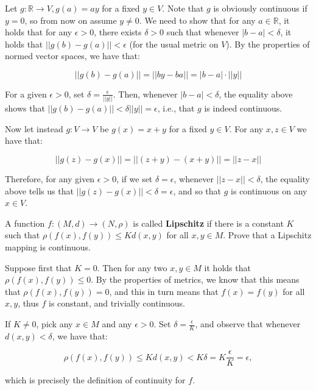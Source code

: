 \begin{solution}
    
    Let $g: \mathbb{R} \rightarrow V, g(a) = ay$ for a fixed $y \in V$.
    Note that $g$ is obviously continuous if $y = 0$, so from now on assume $y \neq 0$.
    We need to show that for any $a \in \mathbb{R}$, it holds that for any $\epsilon > 0$, there exists $\delta > 0$ such that whenever $\lvert b - a \rvert < \delta$, it holds that $\lvert \lvert g(b) - g(a) \rvert \rvert < \epsilon$ (for the usual metric on $V$).
    By the properties of normed vector spaces, we have that:

    \[\lvert \lvert g(b) - g(a) \rvert \rvert = \lvert \lvert by - ba \rvert \rvert = \lvert b - a \rvert \cdot \lvert \lvert y \rvert \rvert \]

    For a given $\epsilon > 0$, set $\delta = \frac{\epsilon}{\lvert \lvert y \rvert \rvert}$.
    Then, whenever $\lvert b - a \rvert < \delta$, the equality above shows that $\lvert \lvert g(b) - g(a) \rvert \rvert < \delta \lvert \lvert y \rvert \rvert = \epsilon$, i.e., that $g$ is indeed continuous.

    Now let instead $g: V \rightarrow V$ be $g(x) = x + y$ for a fixed $y \in V$.
    For any $x, z \in V$ we have that:

    \[\lvert \lvert g(z) - g(x) \rvert \rvert = \lvert \lvert (z + y) - (x + y) \rvert \rvert = \lvert \lvert z - x \rvert \rvert\]

    Therefore, for any given $\epsilon > 0$, if we set $\delta = \epsilon$, whenever $\lvert \lvert z - x \rvert \rvert < \delta$, the equality above tells us that $\lvert \lvert g(z) - g(x) \rvert \rvert < \delta = \epsilon$, and so that $g$ is continuous on any $x \in V$.
\end{solution}

\begin{exercise}{25}
    A function $f: (M, d) \rightarrow (N, \rho)$ is called \textbf{Lipschitz} if there is a constant $K$ such that $\rho(f(x), f(y)) \leq K d(x, y)$ for all $x, y \in M$.
    Prove that a Lipschitz mapping is continuous.
\end{exercise}

\begin{solution}
    
    Suppose first that $K = 0$.
    Then for any two $x, y \in M$ it holds that $\rho(f(x), f(y)) \leq 0$.
    By the properties of metrics, we know that this means that $\rho(f(x), f(y)) = 0$, and this in turn means that $f(x) = f(y)$ for all $x, y$, thus $f$ is constant, and trivially continuous.

    If $K \neq 0$, pick any $x \in M$ and any $\epsilon > 0$.
    Set $\delta = \frac{\epsilon}{K}$, and observe that whenever $d(x, y) < \delta$, we have that:

    \[\rho(f(x), f(y)) \leq K d(x, y) < K \delta = K \frac{\epsilon}{K} = \epsilon,\]

    which is precisely the definition of continuity for $f$.
\end{solution}

